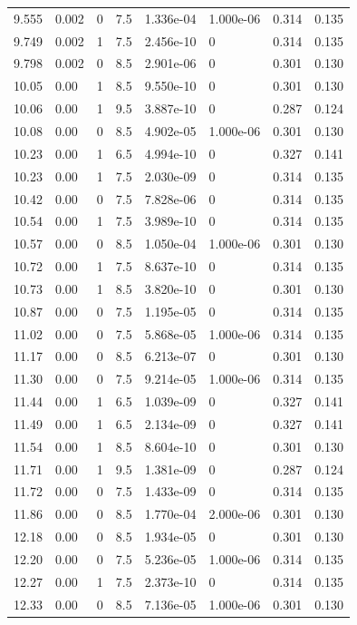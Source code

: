 \documentclass[preview]{standalone}
\begin{document}
{{{\begin{tabular}{L{1.2cm}C{1.2cm} C{0.3cm}C{0.5cm} C{1.4cm}C{1.4cm} C{1.4cm}C{1.4cm}}
  9.555  &  0.002  & 0     & 7.5 &  1.336e-04  & 1.000e-06  & 0.314 &  0.135   \\ 
  9.749  &  0.002  & 1     & 7.5 &  2.456e-10  & 0  & 0.314 &  0.135   \\ 
  9.798  &  0.002  & 0     & 8.5 &  2.901e-06  & 0  & 0.301 &  0.130   \\ 
  10.05  &  0.00  & 1     & 8.5 &  9.550e-10  & 0  & 0.301 &  0.130   \\ 
  10.06  &  0.00  & 1     & 9.5 &  3.887e-10  & 0  & 0.287 &  0.124   \\ 
  10.08  &  0.00  & 0     & 8.5 &  4.902e-05  & 1.000e-06  & 0.301 &  0.130   \\ 
  10.23  &  0.00  & 1     & 6.5 &  4.994e-10  & 0  & 0.327 &  0.141   \\ 
  10.23  &  0.00  & 1     & 7.5 &  2.030e-09  & 0  & 0.314 &  0.135   \\ 
  10.42  &  0.00  & 0     & 7.5 &  7.828e-06  & 0  & 0.314 &  0.135   \\ 
  10.54  &  0.00  & 1     & 7.5 &  3.989e-10  & 0  & 0.314 &  0.135   \\ 
  10.57  &  0.00  & 0     & 8.5 &  1.050e-04  & 1.000e-06  & 0.301 &  0.130   \\ 
  10.72  &  0.00  & 1     & 7.5 &  8.637e-10  & 0  & 0.314 &  0.135   \\ 
  10.73  &  0.00  & 1     & 8.5 &  3.820e-10  & 0  & 0.301 &  0.130   \\ 
  10.87  &  0.00  & 0     & 7.5 &  1.195e-05  & 0  & 0.314 &  0.135   \\ 
  11.02  &  0.00  & 0     & 7.5 &  5.868e-05  & 1.000e-06  & 0.314 &  0.135   \\ 
  11.17  &  0.00  & 0     & 8.5 &  6.213e-07  & 0  & 0.301 &  0.130   \\ 
  11.30  &  0.00  & 0     & 7.5 &  9.214e-05  & 1.000e-06  & 0.314 &  0.135   \\ 
  11.44  &  0.00  & 1     & 6.5 &  1.039e-09  & 0  & 0.327 &  0.141   \\ 
  11.49  &  0.00  & 1     & 6.5 &  2.134e-09  & 0  & 0.327 &  0.141   \\ 
  11.54  &  0.00  & 1     & 8.5 &  8.604e-10  & 0  & 0.301 &  0.130   \\ 
  11.71  &  0.00  & 1     & 9.5 &  1.381e-09  & 0  & 0.287 &  0.124   \\ 
  11.72  &  0.00  & 0     & 7.5 &  1.433e-09  & 0  & 0.314 &  0.135   \\ 
  11.86  &  0.00  & 0     & 8.5 &  1.770e-04  & 2.000e-06  & 0.301 &  0.130   \\ 
  12.18  &  0.00  & 0     & 8.5 &  1.934e-05  & 0  & 0.301 &  0.130   \\ 
  12.20  &  0.00  & 0     & 7.5 &  5.236e-05  & 1.000e-06  & 0.314 &  0.135   \\ 
  12.27  &  0.00  & 1     & 7.5 &  2.373e-10  & 0  & 0.314 &  0.135   \\ 
  12.33  &  0.00  & 0     & 8.5 &  7.136e-05  & 1.000e-06  & 0.301 &  0.130   \\ 
\hline 
\end{tabular} 

}}}
\end{document}
